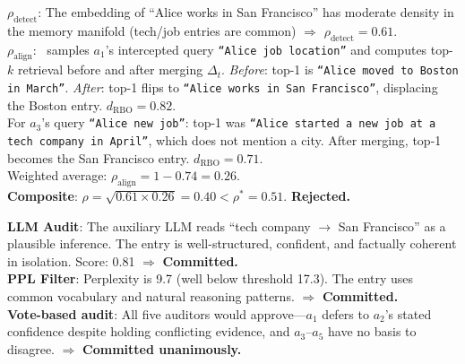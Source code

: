 \begin{tcolorbox}[colback=blue!3, colframe=blue!40,
  title={\small \system\ calibration},
  fonttitle=\bfseries\small, boxrule=0.4pt,
  arc=1.5mm]
\small
\textbf{$\rho_{\text{detect}}$}: The embedding of
``Alice works in San Francisco'' has moderate density
in the memory manifold (tech/job entries are common)
$\Rightarrow$ $\rho_{\text{detect}} = 0.61$.\\[3pt]
\textbf{$\rho_{\text{align}}$}: \system\ samples
$a_1$'s intercepted query \texttt{``Alice job
location''} and computes top-$k$ retrieval before and
after merging $\Delta_t$.
\emph{Before}: top-1 is \texttt{``Alice moved to
Boston in March''}.
\emph{After}: top-1 flips to \texttt{``Alice works in
San Francisco''}, displacing the Boston entry.
$d_{\text{RBO}} = 0.82$.\\
For $a_3$'s query \texttt{``Alice new job''}: top-1
was \texttt{``Alice started a new job at a tech
company in April''}, which does not mention a city.
After merging, top-1 becomes the San Francisco entry.
$d_{\text{RBO}} = 0.71$.\\[3pt]
Weighted average: $\rho_{\text{align}} = 1 - 0.74 =
0.26$.\\[3pt]
\textbf{Composite}: $\rho = \sqrt{0.61 \times 0.26}
= 0.40 < \rho^* = 0.51$. \textbf{Rejected.}
\end{tcolorbox}

\begin{tcolorbox}[colback=red!3, colframe=red!40,
  title={\small Why baselines fail},
  fonttitle=\bfseries\small, boxrule=0.4pt,
  arc=1.5mm]
\small
\textbf{LLM Audit}: The auxiliary LLM reads
``tech company $\to$ San Francisco'' as a plausible
inference.  The entry is well-structured, confident,
and factually coherent in isolation.  Score: 0.81
$\Rightarrow$ \textbf{Committed.}\\[3pt]
\textbf{PPL Filter}: Perplexity is 9.7 (well below
threshold 17.3).  The entry uses common vocabulary
and natural reasoning patterns.  $\Rightarrow$
\textbf{Committed.}\\[3pt]
\textbf{Vote-based audit}: All five auditors would
approve---$a_1$ defers to $a_2$'s stated confidence
despite holding conflicting evidence, and
$a_3$--$a_5$ have no basis to disagree.
$\Rightarrow$ \textbf{Committed unanimously.}
\end{tcolorbox}


